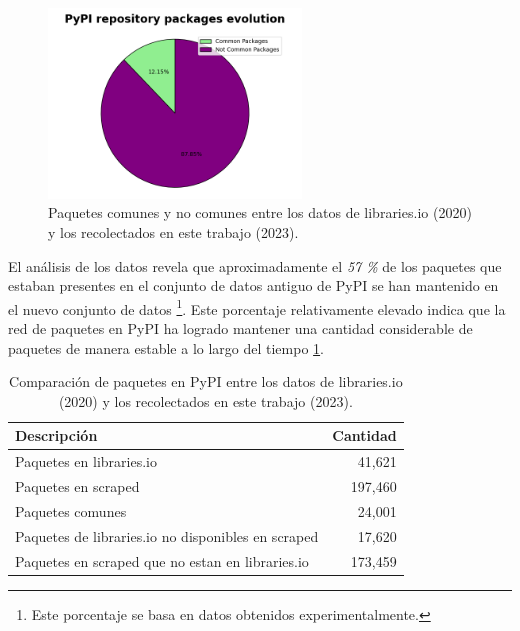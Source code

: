 \begin{figure}[h!]
    \begin{center}
        \includegraphics[width=0.6\textwidth]{img/pypi/circ_common_packages.png}
        \caption{Paquetes comunes y no comunes entre los datos de libraries.io (2020) y los recolectados en este trabajo (2023).}
        \label{fig:pipy_common_packages_circle}
    \end{center}
\end{figure}

El análisis de los datos revela que aproximadamente el \textit{57 \%} de los paquetes que estaban
presentes en el conjunto de datos antiguo de PyPI se han mantenido en el nuevo conjunto de datos
\footnote{Este porcentaje se basa en datos obtenidos experimentalmente.}. Este porcentaje
relativamente elevado indica que la red de paquetes en PyPI ha logrado mantener una cantidad considerable
de paquetes de manera estable a lo largo del tiempo \ref{tab:pypi_common_packages}.

\begin{table}[h!]
    \begin{center}
        \begin{tabular}{|l|r|}
            \hline
            \textbf{Descripción}                               & \textbf{Cantidad} \\
            \hline
            Paquetes en libraries.io                           & 41,621            \\
            Paquetes en scraped                                & 197,460           \\
            Paquetes comunes                                   & 24,001            \\
            Paquetes de libraries.io no disponibles en scraped & 17,620            \\
            Paquetes en scraped que no estan en libraries.io   & 173,459           \\
            \hline
        \end{tabular}
    \end{center}
    \label{tab:pypi_common_packages}
    \caption{Comparación de paquetes en PyPI entre los datos de libraries.io (2020) y los recolectados en este trabajo (2023).}
\end{table}

